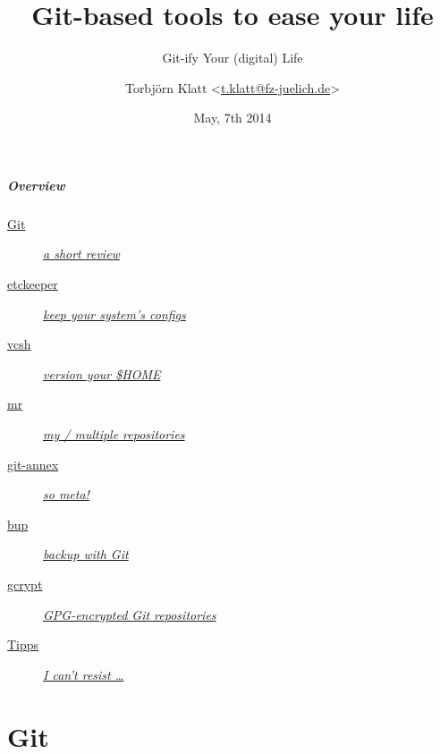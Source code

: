 \documentclass[english,hyperref={pdfpagelabels=false},aspectratio=169]{beamer}
\title{Git-based tools to ease your life}
\subtitle{Git-ify Your (digital) Life}
\author{Torbjörn Klatt <\href{mailto:t.klatt@fz-juelich.de}{t.klatt@fz-juelich.de}>}
\institute{JSC Internal Seminar}
\date{May, 7th 2014}
\begin{document}
\maketitle

\begin{frame}
  \frametitle{Overview}
  \begin{description}
    \item[\hyperlink{git}{Git}] \hyperlink{git}{\textit{a short review}}
    \item[\hyperlink{etckeeper}{etckeeper}] \hyperlink{etckeeper}{\textit{keep your system's configs}}
    \item[\hyperlink{vcsh}{vcsh}] \hyperlink{vcsh}{\textit{version your \$HOME}}
    \item[\hyperlink{mr}{mr}] \hyperlink{mr}{\textit{my / multiple repositories}}
    \item[\hyperlink{gitannex}{git-annex}] \hyperlink{gitannex}{\textit{so meta!}}
    \item[\hyperlink{bup}{bup}] \hyperlink{bup}{\textit{backup with Git}}
    \item[\hyperlink{gcrypt}{gcrypt}] \hyperlink{gcrypt}{\textit{GPG-encrypted Git repositories}}
    \item[\hyperlink{tipps}{Tipps}] \hyperlink{tipps}{\textit{I can't resist \dots}}
  \end{description}
\end{frame}


\part{Git}
\makepart
\end{document}
